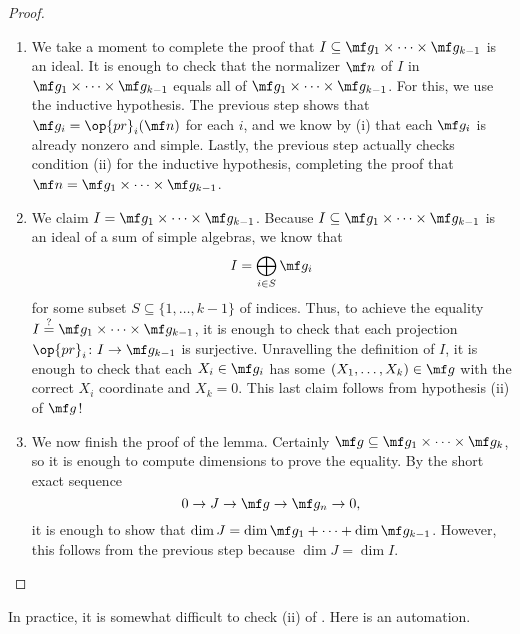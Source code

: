 \documentclass[../thesis.tex]{subfiles}
\begin{document}
\begin{proof}
\begin{enumerate}
		\item We take a moment to complete the proof that $I\subseteq\mf g_1\times\cdots\times\mf g_{k-1}$ is an ideal. It is enough to check that the normalizer $\mf n$ of $I$ in $\mf g_1\times\cdots\times\mf g_{k-1}$ equals all of $\mf g_1\times\cdots\times\mf g_{k-1}$. For this, we use the inductive hypothesis. The previous step shows that $\mf g_i=\op{pr}_i(\mf n)$ for each $i$, and we know by (i) that each $\mf g_i$ is already nonzero and simple. Lastly, the previous step actually checks condition (ii) for the inductive hypothesis, completing the proof that $\mf n=\mf g_1\times\cdots\times\mf g_{k-1}$.

		\item We claim $I=\mf g_1\times\cdots\times\mf g_{k-1}$. Because $I\subseteq\mf g_1\times\cdots\times\mf g_{k-1}$ is an ideal of a sum of simple algebras, we know that
		\[I=\bigoplus_{i\in S}\mf g_i\]
		for some subset $S\subseteq\{1,\ldots,k-1\}$ of indices. Thus, to achieve the equality $I\stackrel?=\mf g_1\times\cdots\times\mf g_{k-1}$, it is enough to check that each projection $\op{pr}_i\colon I\to\mf g_{k-1}$ is surjective. Unravelling the definition of $I$, it is enough to check that each $X_i\in\mf g_i$ has some $(X_1,\ldots,X_k)\in\mf g$ with the correct $X_i$ coordinate and $X_k=0$. This last claim follows from hypothesis (ii) of $\mf g$!

		\item We now finish the proof of the lemma. Certainly $\mf g\subseteq\mf g_1\times\cdots\times\mf g_k$, so it is enough to compute dimensions to prove the equality. By the short exact sequence
		\[0\to J\to\mf g\to\mf g_n\to0,\]
		it is enough to show that $\dim J=\dim\mf g_1+\cdots+\dim\mf g_{k-1}$. However, this follows from the previous step because $\dim J=\dim I$.
		\qedhere
	\end{enumerate}
\end{proof}
In practice, it is somewhat difficult to check (ii) of . Here is an automation.
\end{document}
